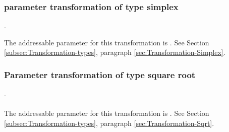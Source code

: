 \subsubsection{parameter transformation of type simplex}
.
\label{syntax:Transformation-Simplex}


The addressable parameter for this transformation is . See Section \ref{subsec:Transformation-types}, paragraph \ref{sec:Transformation-Simplex}.

\subsubsection{Parameter transformation of type square root}
.
\label{syntax:Transformation-Sqrt} \\ \\
The addressable parameter for this transformation is . See Section \ref{subsec:Transformation-types}, paragraph \ref{sec:Transformation-Sqrt}.

